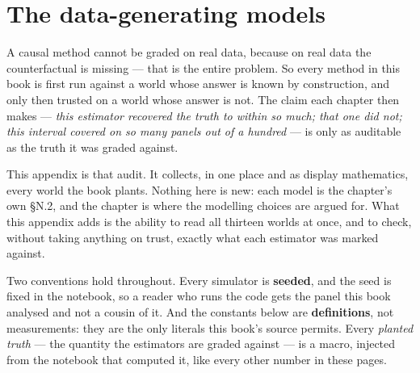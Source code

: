 %
%
\chapter{The data-generating models}
\label{app:dgp}

\newcommand{\refuplift}{\ifcsname r@ch:uplift\endcsname\cref{ch:uplift}\else Chapter~3\fi}
\newcommand{\refmmm}{\ifcsname r@ch:mmm\endcsname\cref{ch:mmm}\else Chapter~8\fi}

A causal method cannot be graded on real data, because on real data the counterfactual is missing
--- that is the entire problem. So every method in this book is first run against a world whose
answer is known by construction, and only then trusted on a world whose answer is not. The claim
each chapter then makes --- \emph{this estimator recovered the truth to within so much; that one
did not; this interval covered on so many panels out of a hundred} --- is only as auditable as the
truth it was graded against.

This appendix is that audit. It collects, in one place and as display mathematics, every world the
book plants. Nothing here is new: each model is the chapter's own \S N.2, and the chapter is where
the modelling choices are argued for. What this appendix adds is the ability to read all thirteen
worlds at once, and to check, without taking anything on trust, exactly what each estimator was
marked against.

Two conventions hold throughout. Every simulator is \textbf{seeded}, and the seed is fixed in the
notebook, so a reader who runs the code gets the panel this book analysed and not a cousin of it.
And the constants below are \textbf{definitions}, not measurements: they are the only literals this
book's source permits. Every \emph{planted truth} --- the quantity the estimators are graded
against --- is a macro, injected from the notebook that computed it, like every other number in
these pages.

